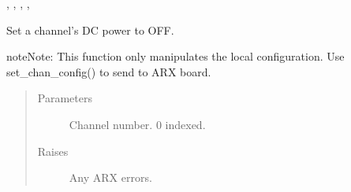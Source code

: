 \documentclass[letterpaper,10pt,english]{sphinxmanual}
\begin{document}
\begin{fulllineitems}
\begin{fulllineitems}
\begin{quote}
\begin{description}
\end{description}\end{quote}




{\hyperref[\detokenize{index:lwautils.lwa_arx.ARX.show_chan_cfg}]{}}, {\hyperref[\detokenize{index:lwautils.lwa_arx.ARX.set_chan_cfg}]{}}, {\hyperref[\detokenize{index:lwautils.lwa_arx.ARX.set_chan_cfg_lowpass_narrow}]{}}, {\hyperref[\detokenize{index:lwautils.lwa_arx.ARX.set_chan_cfg_lowpass_wide}]{}}, {\hyperref[\detokenize{index:lwautils.lwa_arx.ARX.set_chan_cfg_highpass_narrow}]{}}



\end{fulllineitems}


\begin{fulllineitems}
\label{\detokenize{index:lwautils.lwa_arx.ARX.set_chan_cfg_input_dc_pwr_off}}
Set a channel’s DC power to OFF.

\begin{sphinxadmonition}{note}{Note:}
This function only manipulates the local configuration.
Use set\_chan\_config() to send to ARX board.
\end{sphinxadmonition}
\begin{quote}\begin{description}
\item[{Parameters}] \leavevmode
{} \textendash{} Channel number. 0 indexed.

\item[{Raises}] \leavevmode
{} \textendash{} Any ARX errors.

\end{description}\end{quote}



\end{fulllineitems}
\end{fulllineitems}
\end{document}
